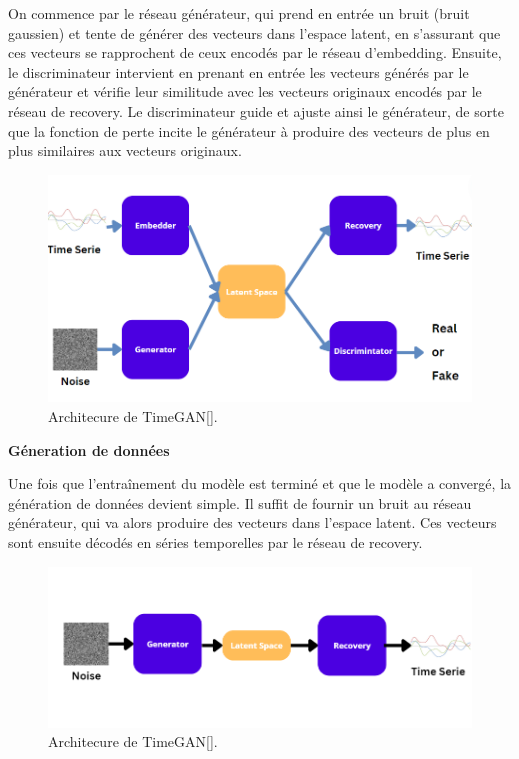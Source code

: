 On commence par le réseau générateur, qui prend en entrée un bruit (bruit
gaussien) et tente de générer des vecteurs dans l'espace latent, en s'assurant
que ces vecteurs se rapprochent de ceux encodés par le réseau d'embedding.
Ensuite, le discriminateur intervient en prenant en entrée les vecteurs générés
par le générateur et vérifie leur similitude avec les vecteurs originaux
encodés par le réseau de recovery. Le discriminateur guide et ajuste ainsi le
générateur, de sorte que la fonction de perte incite le générateur à produire
des vecteurs de plus en plus similaires aux vecteurs originaux.

\begin{figure}[hbt!]
  \centering
  \includegraphics[width=14cm]{images_pfe/timegan_archi_.png}
  \caption{Architecure de TimeGAN[\cite{yoon2019time}].}
  \label{fig:timegan}
\end{figure}
\FloatBarrier

\textbf{Géneration de données}

Une fois que l'entraînement du modèle est terminé et que le modèle a convergé,
la génération de données devient simple. Il suffit de fournir un bruit au
réseau générateur, qui va alors produire des vecteurs dans l'espace latent. Ces
vecteurs sont ensuite décodés en séries temporelles par le réseau de recovery.

\begin{figure}[hbt!]
  \centering
  \includegraphics[width=14cm]{images_pfe/gents.png}
  \caption{Architecure de TimeGAN[\cite{yoon2019time}].}
  \label{fig:timegan}
\end{figure}
\FloatBarrier



